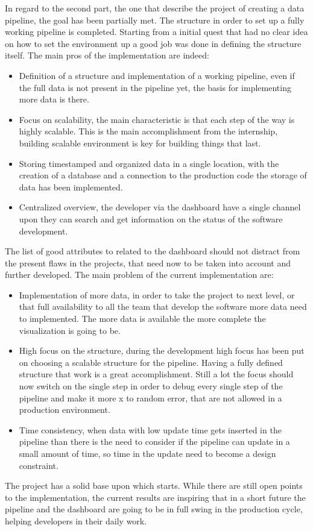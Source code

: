\documentclass[../main.tex]{subfiles}
\begin{document}
In regard to the second part, the one that describe the project of creating a data pipeline, the goal has been partially met. The structure in order to set up a fully working pipeline is completed. Starting from a initial quest that had no clear idea on how to set the environment up a good job was done in defining the structure itself. The main pros of the implementation are indeed:
\begin{itemize}
    \item Definition of a structure and implementation of a working pipeline, even if the full data is not present in the pipeline yet, the basis for implementing more data is there. 
    \item Focus on scalability, the main characteristic is that each step of the way is highly scalable. This is the main accomplishment from the internship, building scalable environment is key for building things that last.
    \item Storing timestamped and organized data in a single location, with the creation of a database and a connection to the production code the storage of data has been implemented. 
    \item Centralized overview, the developer via the dashboard have a single channel upon they can search and get information on the status of the software development. 
\end{itemize}
The list of good attributes to related to the dashboard should not distract from the present flaws in the projects, that need now to be taken into account and further developed. The main problem of the current implementation are:
\begin{itemize}
    \item Implementation of more data, in order to take the project to next level, or that full availability to all the team that develop the software more data need to implemented. The more data is available the more complete the visualization is going to be.
    \item High focus on the structure, during the development high focus has been put on choosing a scalable structure for the pipeline. Having a fully defined structure that work is a great accomplishment. Still a lot the focus should now switch on the single step in order to debug every single step of the pipeline and make it more x to random error, that are not allowed in a production environment.
    \item Time consistency, when data with low update time gets inserted in the pipeline than there is the need to consider if the pipeline can update in a small amount of time, so time in the update need to become a design constraint. 
\end{itemize}
The project has a solid base upon which starts. While there are still open points to the implementation, the current results are inspiring that in a short future the pipeline and the dashboard are going to be in full swing in the production cycle, helping developers in their daily work. 
\cleardoublepage
\end{document}
